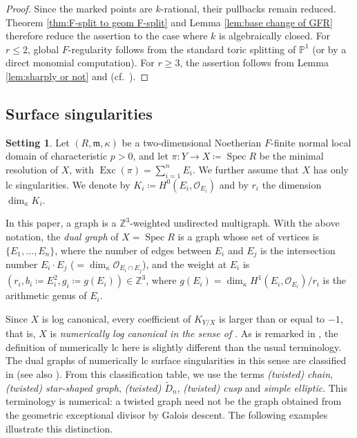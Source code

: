 \documentclass[12pt]{amsart}
\def\tilde{\widetilde}
\def\Spec{\operatorname{Spec}}
\def\Exc{\operatorname{Exc}}
\def\m{{\mathfrak m}}
\newcommand{\PP}{\mathbb{P}}
\newcommand{\sO}{\mathcal{O}}
\theoremstyle{plain}
\theoremstyle{definition}
\newtheorem{setting}[thm]{Setting}
\theoremstyle{remark}
\newtheorem{defn and notation}[thm]{Definition and Notation}
\theoremstyle{plain}
\numberwithin{equation}{thm}
\begin{document}
\begin{proof}
    Since the marked points are $k$-rational, their pullbacks remain reduced. Theorem \ref{thm:F-split to geom F-split} and Lemma \ref{lem:base change of GFR} therefore reduce the assertion to the case where $k$ is algebraically closed.
    For $r\leq2$, global $F$-regularity follows from the standard toric splitting of $\PP^1$ (or by a direct monomial computation). For $r\geq3$, the assertion follows from Lemma \ref{lem:sharply or not} and \cite[Proposition 2.6]{Hara(two-dim)} (cf.~\cite{Watanabe(one-dim)}).

\end{proof}



\subsection{Surface singularities}





\begin{setting}\label{notation:normal surface sings}
Let $(R,\m,\kappa)$ be a two-dimensional Noetherian $F$-finite normal local domain of characteristic $p>0$, and let $\pi\colon Y\to X \coloneqq \Spec R$ be the minimal resolution of $X$, with $\Exc(\pi)=\sum_{i=1}^n E_i$.
We further assume that $X$ has only lc singularities.
We denote by $K_i \coloneqq H^0(E_i,\sO_{E_i})$ and by $r_i$ the dimension $\dim_{\kappa} K_i$.
\end{setting}

In this paper, a graph is a $\mathbb{Z}^3$-weighted undirected multigraph.
With the above notation, the \emph{dual graph} of $X=\Spec R$ is a graph whose set of vertices is $\{E_1, \dots, E_n\}$, where the number of edges between $E_i$ and $E_j$ is the intersection number $E_i \cdot E_j$ ($= \dim_{\kappa} \mathcal{O}_{E_i \cap E_j}$), and the weight at $E_i$ is $(r_i, b_i \coloneqq E_i^2, g_i \coloneqq g(E_i)) \in \mathbb{Z}^3$, where $g(E_i) = \dim_{\kappa} H^1(E_i, \mathcal{O}_{E_i}) / r_i$ is the arithmetic genus of $E_i$.


Since $X$ is log canonical, every coefficient of $K_{Y/X}$ is larger than or equal to $-1$, that is, $X$ is \emph{numerically log canonical in the sense of \cite[Paragraph 2.27]{Kol13}}.
As is remarked in \cite[Paragraph 2.27]{Kol13}, the definition of numerically lc here is slightly different than the usual terminology.
The dual graphs of numerically lc surface singularities in this sense are classified in \cite[Subsection 3.3]{Kol13} (see also \cite[Appendix A]{Sato23}).
From this classification table,
we use the terms \emph{(twisted) chain}, \emph{(twisted) star-shaped graph}, \emph{(twisted) $\tilde D_n$}, \emph{(twisted) cusp} and \emph{simple elliptic}.
This terminology is numerical: a twisted graph need not be the graph obtained from the geometric exceptional divisor by Galois descent.
The following examples illustrate this distinction.
\end{document}
